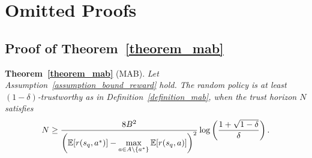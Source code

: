 \appendix

% 



\section{Omitted Proofs}
\label{appendix_omit_proof}



\subsection{Proof of Theorem~\ref{theorem_mab}}
\label{appendix_omit_proof_theorem_mab}
%
\textbf{Theorem~\ref{theorem_mab}} (MAB). \textit{
    Let Assumption~\ref{assumption_bound_reward} hold. The random policy is at least $(1-\delta)$-trustworthy as in Definition~\ref{definition_mab}, when the trust horizon $N$ satisfies
    \begin{align}
        N \geq \frac{8B^2}{\left({\mathbb E}[r(s_q, a^*)] - \max\limits_{a \in A \setminus \{a^*\}} {\mathbb E}[r(s_q, a)] \right)^2} \log \left( \frac{1+\sqrt{1-\delta}}{\delta} \right).
    \end{align}
}
%
